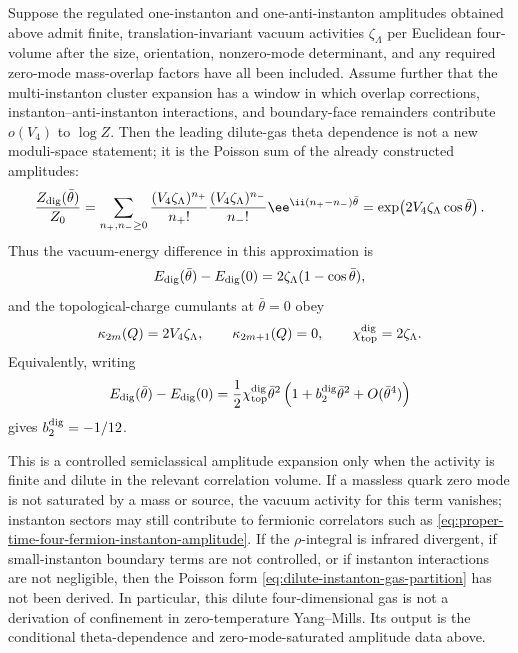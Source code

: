 \begin{controlledapproximation}
\label{ca:dilute-instanton-gas-amplitude}
Suppose the regulated one-instanton and one-anti-instanton amplitudes obtained
above admit finite, translation-invariant vacuum activities \(\zeta_\Lambda\)
per Euclidean four-volume after the size, orientation, nonzero-mode
determinant, and any required zero-mode mass-overlap factors have all been
included.  Assume further that the multi-instanton cluster expansion has a
window in which overlap corrections, instanton--anti-instanton interactions,
and boundary-face remainders contribute \(o(V_4)\) to \(\log Z\).  Then the
leading dilute-gas theta dependence is not a new moduli-space statement; it is
the Poisson sum of the already constructed amplitudes:
\begin{equation}
  \frac{Z_{\rm dig}(\bar\theta)}{Z_0}
  =
  \sum_{n_+,n_-\ge0}
  \frac{(V_4\zeta_\Lambda)^{n_+}}{n_+!}
  \frac{(V_4\zeta_\Lambda)^{n_-}}{n_-!}
  \ee^{\ii(n_+-n_-)\bar\theta}
  =
  \exp\!\left(2V_4\zeta_\Lambda\cos\bar\theta\right).
  \label{eq:dilute-instanton-gas-partition}
\end{equation}
Thus the vacuum-energy difference in this approximation is
\begin{equation}
  E_{\rm dig}(\bar\theta)-E_{\rm dig}(0)
  =
  2\zeta_\Lambda(1-\cos\bar\theta),
  \label{eq:dilute-instanton-gas-energy}
\end{equation}
and the topological-charge cumulants at \(\bar\theta=0\) obey
\begin{equation}
  \kappa_{2m}(Q)=2V_4\zeta_\Lambda,
  \qquad
  \kappa_{2m+1}(Q)=0,
  \qquad
  \chi_{\rm top}^{\rm dig}=2\zeta_\Lambda .
  \label{eq:dilute-instanton-gas-cumulants}
\end{equation}
Equivalently, writing
\[
  E_{\rm dig}(\bar\theta)-E_{\rm dig}(0)
  =
  \frac12\chi_{\rm top}^{\rm dig}\bar\theta^2
  \left(
    1+b_2^{\rm dig}\bar\theta^2+O(\bar\theta^4)
  \right)
\]
gives \(b_2^{\rm dig}=-1/12\).

This is a controlled semiclassical amplitude expansion only when the activity
is finite and dilute in the relevant correlation volume.  If a massless quark
zero mode is not saturated by a mass or source, the vacuum activity for this
term vanishes; instanton sectors may still contribute to fermionic correlators
such as \eqref{eq:proper-time-four-fermion-instanton-amplitude}.  If the
\(\rho\)-integral is infrared divergent, if small-instanton boundary terms are
not controlled, or if instanton interactions are not negligible, then the
Poisson form \eqref{eq:dilute-instanton-gas-partition} has not been derived.
In particular, this dilute four-dimensional gas is not a derivation of
confinement in zero-temperature Yang--Mills.  Its output is the conditional
theta-dependence and zero-mode-saturated amplitude data above.
\end{controlledapproximation}

